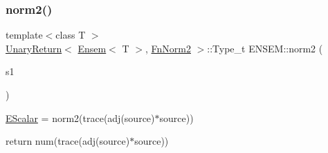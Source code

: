 \mbox{\label{namespaceENSEM_a846e917e7120ca978ffdb7146357bf07}} 
\subsubsection{\texorpdfstring{norm2()}{norm2()}\hspace{0.1cm}{\footnotesize\ttfamily [1/3]}}
{\footnotesize\ttfamily template$<$class T $>$ \\
\mbox{\hyperlink{structENSEM_1_1UnaryReturn}{Unary\+Return}}$<$ \mbox{\hyperlink{classENSEM_1_1Ensem}{Ensem}}$<$ T $>$, \mbox{\hyperlink{structENSEM_1_1FnNorm2}{Fn\+Norm2}} $>$\+::Type\+\_\+t E\+N\+S\+E\+M\+::norm2 (\begin{DoxyParamCaption}\item[{const \mbox{\hyperlink{classENSEM_1_1Ensem}{Ensem}}$<$ T $>$ \&}]{s1 }\end{DoxyParamCaption})\hspace{0.3cm}{\ttfamily [inline]}}



\mbox{\hyperlink{classENSEM_1_1EScalar}{E\+Scalar}} = norm2(trace(adj(source)$\ast$source)) 

return num(trace(adj(source)$\ast$source))

